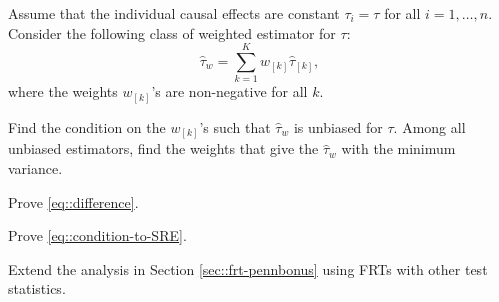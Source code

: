 \begin{HomeworkProblem}\label{exr:5-3}

Assume that the individual causal effects are constant $\tau_i = \tau$ for all $i=1,\ldots, n$.
Consider the following class of weighted estimator for $\tau$:
\[
\hat{\tau}_w = \sum_{k=1}^K  w_{[k]}  \hat{\tau}_{[k]} ,
\]
where the weights $w_{[k]}  $'s are non-negative for all $k$.

Find the condition on the $w_{[k]}$'s such that $\hat{\tau}_w $ is unbiased for $\tau$. Among all unbiased estimators, find the weights that give the $\hat{\tau}_w$ with the minimum variance.


\end{HomeworkProblem}

\begin{HomeworkProblem}\label{exr:5-4}

Prove \eqref{eq::difference}.



\end{HomeworkProblem}

\begin{HomeworkProblem}\label{exr:5-5}


Prove \eqref{eq::condition-to-SRE}.



\end{HomeworkProblem}

\begin{HomeworkProblem}\label{exr:5-6}

 Extend the analysis in Section \ref{sec::frt-pennbonus} using FRTs with other test statistics.



\end{HomeworkProblem}

